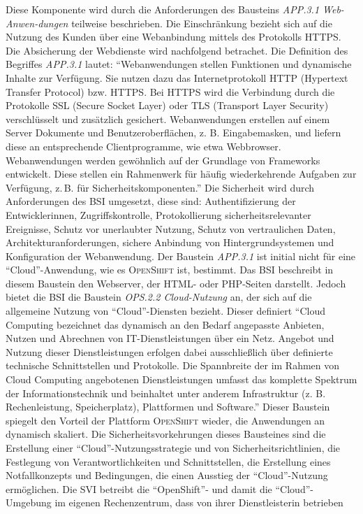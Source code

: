 Diese Komponente wird durch die Anforderungen des Bausteins \textit{APP.3.1 Web-Anwen-dungen} teilweise beschrieben. Die Einschränkung bezieht sich auf die Nutzung des Kunden über eine Webanbindung mittels des Protokolls \ac{HTTPS}. Die Absicherung der Webdienste wird nachfolgend betrachet. Die Definition des Begriffes \textit{APP.3.1} lautet: \enquote{Webanwendungen stellen Funktionen und dynamische Inhalte zur Verfügung. Sie nutzen dazu das Internetprotokoll HTTP (Hypertext Transfer Protocol) bzw. HTTPS. Bei HTTPS wird die Verbindung durch die Protokolle SSL (Secure Socket Layer) oder TLS (Transport Layer Security) verschlüsselt und zusätzlich gesichert. Webanwendungen erstellen auf einem Server Dokumente und Benutzeroberflächen, z. B. Eingabemasken, und liefern diese an entsprechende Clientprogramme, wie etwa Webbrowser. Webanwendungen werden gewöhnlich auf der Grundlage von Frameworks entwickelt. Diese stellen ein Rahmenwerk für häufig wiederkehrende Aufgaben zur Verfügung, z.\,B. für Sicherheitskomponenten.}\autocite[][S.\,383]{bundesamt_fur_sicherheit_in_der_informationstechnik_bsi_it-grundschutz-kompendium_2020} Die Sicherheit wird durch Anforderungen des \ac{BSI} umgesetzt, diese sind: Authentifizierung der Entwicklerinnen, Zugriffskontrolle, Protokollierung sicherheitsrelevanter Ereignisse, Schutz vor unerlaubter Nutzung, Schutz von vertraulichen Daten, Architekturanforderungen, sichere Anbindung von Hintergrundsystemen und Konfiguration der Webanwendung.\autocite[vgl.][S.\,385-389]{bundesamt_fur_sicherheit_in_der_informationstechnik_bsi_it-grundschutz-kompendium_2020} Der Baustein \textit{APP.3.1} ist initial nicht für eine \enquote{Cloud}-Anwendung, wie es \textsc{OpenShift} ist, bestimmt. Das \ac{BSI} beschreibt in diesem Baustein den Webserver, der \textsc{HTML}- oder \textsc{PHP}-Seiten darstellt. Jedoch bietet die \ac{BSI} die Baustein \textit{OPS.2.2 Cloud-Nutzung} an, der sich auf die allgemeine Nutzung von \enquote{Cloud}-Diensten bezieht. Dieser definiert \enquote{Cloud Computing bezeichnet das dynamisch an den Bedarf angepasste Anbieten, Nutzen und Abrechnen von IT-Dienstleistungen über ein Netz. Angebot und Nutzung dieser Dienstleistungen erfolgen dabei ausschließlich über definierte technische Schnittstellen und Protokolle. Die Spannbreite der im Rahmen von Cloud Computing angebotenen Dienstleistungen umfasst das komplette Spektrum der Informationstechnik und beinhaltet unter anderem Infrastruktur (z. B. Rechenleistung, Speicherplatz), Plattformen und Software.}\autocite[][S.\,265]{bundesamt_fur_sicherheit_in_der_informationstechnik_bsi_it-grundschutz-kompendium_2020} Dieser Baustein spiegelt den Vorteil der Plattform \textsc{OpenShift} wieder, die Anwendungen an dynamisch skaliert. Die Sicherheitsvorkehrungen dieses Bausteines sind die Erstellung einer \enquote{Cloud}-Nutzungsstrategie und von Sicherheitsrichtlinien, die Festlegung von Verantwortlichkeiten und Schnittstellen, die Erstellung eines Notfallkonzepts und Bedingungen, die einen Ausstieg der \enquote{Cloud}-Nutzung ermöglichen.\autocite[vgl.][S.\,268-271]{bundesamt_fur_sicherheit_in_der_informationstechnik_bsi_it-grundschutz-kompendium_2020} Die \ac{SVI} betreibt die \enquote{OpenShift}- und damit die \enquote{Cloud}-Umgebung im  eigenen Rechenzentrum, dass von ihrer Dienstleisterin betrieben 